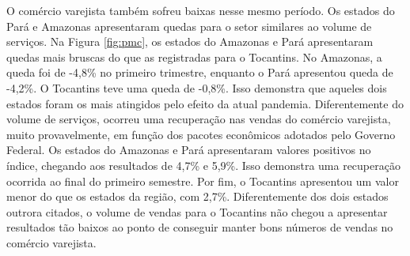 \par O comércio varejista também sofreu baixas nesse mesmo período. Os estados do Pará e Amazonas apresentaram quedas para o setor similares ao volume de serviços. Na Figura \ref{fig:pmc}, os estados do Amazonas e Pará apresentaram quedas mais bruscas do que as registradas para o Tocantins. No Amazonas, a queda foi de -4,8\% no primeiro trimestre, enquanto o Pará apresentou queda de -4,2\%. O Tocantins teve uma queda de -0,8\%. Isso demonstra que aqueles dois estados foram os mais atingidos pelo efeito da atual pandemia. Diferentemente do volume de serviços, ocorreu uma recuperação nas vendas do comércio varejista, muito provavelmente, em função dos pacotes econômicos adotados pelo Governo Federal. Os estados do Amazonas e Pará apresentaram valores positivos no índice, chegando aos resultados de 4,7\% e 5,9\%. Isso demonstra uma recuperação ocorrida ao final do primeiro semestre. Por fim, o Tocantins apresentou um valor menor do que os estados da região, com 2,7\%. Diferentemente dos dois estados outrora citados, o volume de vendas para o Tocantins não chegou a apresentar resultados tão baixos ao ponto de conseguir manter bons números de vendas no comércio varejista.
